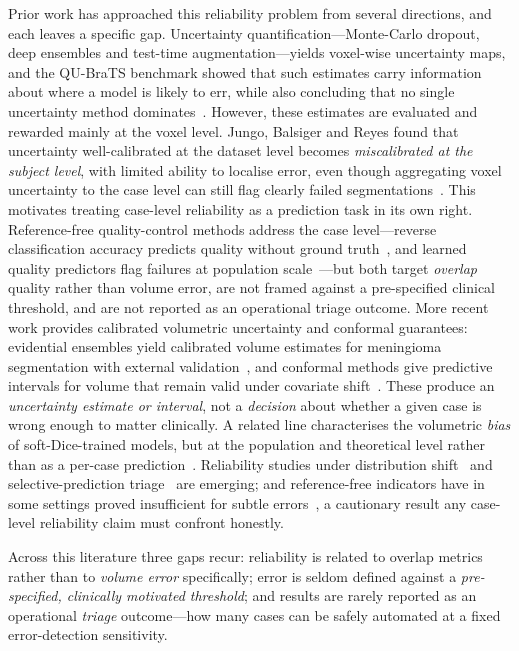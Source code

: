 \documentclass[11pt]{article}
\begin{document}
Prior work has approached this reliability problem from several directions, and each
leaves a specific gap. Uncertainty quantification---Monte-Carlo dropout, deep ensembles
and test-time augmentation---yields voxel-wise uncertainty maps, and the QU-BraTS
benchmark showed that such estimates carry information about where a model is likely to
err, while also concluding that no single uncertainty method dominates~\cite{mehta2022}.
However, these estimates are evaluated and rewarded mainly at the voxel level. Jungo,
Balsiger and Reyes found that uncertainty well-calibrated at the dataset level becomes
\emph{miscalibrated at the subject level}, with limited ability to localise error, even
though aggregating voxel uncertainty to the case level can still flag clearly failed
segmentations~\cite{jungo2020}. This motivates treating case-level reliability as a
prediction task in its own right. Reference-free quality-control methods address the
case level---reverse classification accuracy predicts quality without ground
truth~\cite{valindria2017}, and learned quality predictors flag failures at population
scale~\cite{robinson2019}---but both target \emph{overlap} quality rather than volume
error, are not framed against a pre-specified clinical threshold, and are not reported
as an operational triage outcome. More recent work provides calibrated volumetric
uncertainty and conformal guarantees: evidential ensembles yield calibrated volume
estimates for meningioma segmentation with external validation~\cite{guennoun2026}, and
conformal methods give predictive intervals for volume that remain valid under covariate
shift~\cite{lambert2024}. These produce an \emph{uncertainty estimate or interval}, not
a \emph{decision} about whether a given case is wrong enough to matter clinically. A
related line characterises the volumetric \emph{bias} of soft-Dice-trained models, but
at the population and theoretical level rather than as a per-case
prediction~\cite{bertels2019}. Reliability studies under distribution shift~\cite{shet2026}
and selective-prediction triage~\cite{sharma2026} are emerging; and reference-free
indicators have in some settings proved insufficient for subtle errors~\cite{bricout2026},
a cautionary result any case-level reliability claim must confront honestly.

Across this literature three gaps recur: reliability is related to overlap metrics
rather than to \emph{volume error} specifically; error is seldom defined against a
\emph{pre-specified, clinically motivated threshold}; and results are rarely reported as
an operational \emph{triage} outcome---how many cases can be safely automated at a fixed
error-detection sensitivity.
\end{document}
